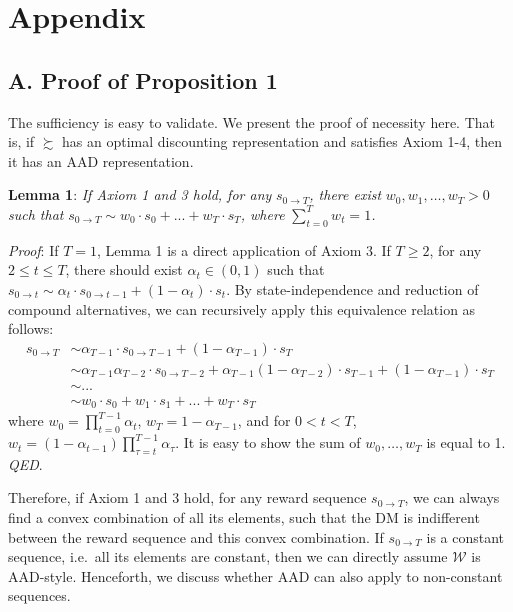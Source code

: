 \newpage

\hypertarget{appendix}{%
\section{Appendix}\label{appendix}}

\hypertarget{a.-proof-of-proposition-1}{%
\subsection{A. Proof of Proposition 1}\label{a.-proof-of-proposition-1}}

The sufficiency is easy to validate. We present the proof of necessity
here. That is, if \(\succsim\) has an optimal discounting representation
and satisfies Axiom 1-4, then it has an AAD representation.

\noindent \textbf{Lemma 1}: \emph{If Axiom 1 and 3 hold, for any}
\(s_{0\rightarrow T}\)\emph{, there exist} \(w_0, w_1, …, w_T > 0\)
\emph{such that}
\(s_{0\rightarrow T} \sim w_0 \cdot s_0 + ...+w_T\cdot s_T\)\emph{,
where} \(\sum_{t=0}^T w_t=1\)\emph{.}

\noindent \emph{Proof}: If \(T=1\), Lemma 1 is a direct application of
Axiom 3. If \(T\geq 2\), for any \(2\leq t\leq T\), there should exist
\(\alpha_t\in(0,1)\) such that
\(s_{0\rightarrow t}\sim \alpha_t\cdot s_{0\rightarrow t-1}+(1-\alpha_t)\cdot s_{t}\).
By state-independence and reduction of compound alternatives, we can
recursively apply this equivalence relation as follows:\[
\begin{aligned}
s_{0\rightarrow T} &\sim \alpha_{T-1}\cdot s_{0\rightarrow T-1} + (1-\alpha_{T-1})\cdot s_T \\
&\sim  \alpha_{T-1}\alpha_{T-2}\cdot s_{0\rightarrow T-2} + \alpha_{T-1}(1-\alpha_{T-2})\cdot s_{T-1} + (1-\alpha_{T-1})\cdot s_T \\
& \sim ...\\
& \sim w_0 \cdot s_0 + w_1\cdot s_1 +... +w_T\cdot s_T
\end{aligned}
\]where \(w_0=\prod_{t=0}^{T-1}\alpha_t\), \(w_T = 1-\alpha_{T-1}\), and
for \(0<t<T\),
\(w_t=(1-\alpha_{t-1})\prod_{\tau=t}^{T-1}\alpha_{\tau}\). It is easy to
show the sum of \(w_0,…,w_T\) is equal to 1. \emph{QED}.

Therefore, if Axiom 1 and 3 hold, for any reward sequence
\(s_{0\rightarrow T}\), we can always find a convex combination of all
its elements, such that the DM is indifferent between the reward
sequence and this convex combination. If \(s_{0\rightarrow T}\) is a
constant sequence, i.e.~all its elements are constant, then we can
directly assume \(\mathcal{W}\) is AAD-style. Henceforth, we discuss
whether AAD can also apply to non-constant sequences.

